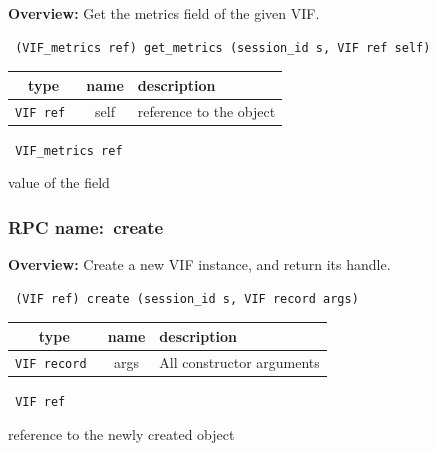 {\bf Overview:} 
Get the metrics field of the given VIF.

\begin{verbatim} (VIF_metrics ref) get_metrics (session_id s, VIF ref self)\end{verbatim}



 
\vspace{0.3cm}
\begin{tabular}{|c|c|p{7cm}|}
 \hline
{\bf type} & {\bf name} & {\bf description} \\ \hline
{\tt VIF ref } & self & reference to the object \\ \hline 

\end{tabular}

\vspace{0.3cm}

{\tt 
VIF\_metrics ref
}


value of the field
\vspace{0.3cm}
\vspace{0.3cm}
\vspace{0.3cm}
\subsubsection{RPC name:~create}

{\bf Overview:} 
Create a new VIF instance, and return its handle.

\begin{verbatim} (VIF ref) create (session_id s, VIF record args)\end{verbatim}



 
\vspace{0.3cm}
\begin{tabular}{|c|c|p{7cm}|}
 \hline
{\bf type} & {\bf name} & {\bf description} \\ \hline
{\tt VIF record } & args & All constructor arguments \\ \hline 

\end{tabular}

\vspace{0.3cm}

{\tt 
VIF ref
}


reference to the newly created object
\vspace{0.3cm}
\vspace{0.3cm}
\vspace{0.3cm}
